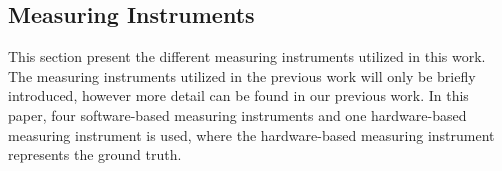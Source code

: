 \subsection{Measuring Instruments}
This section present the different measuring instruments utilized in this work. The measuring instruments utilized in the previous work will only be briefly introduced, however more detail can be found in our previous work\cite{biksbois}. In this paper, four software-based measuring instruments and one hardware-based measuring instrument is used, where the hardware-based measuring instrument represents the ground truth.



